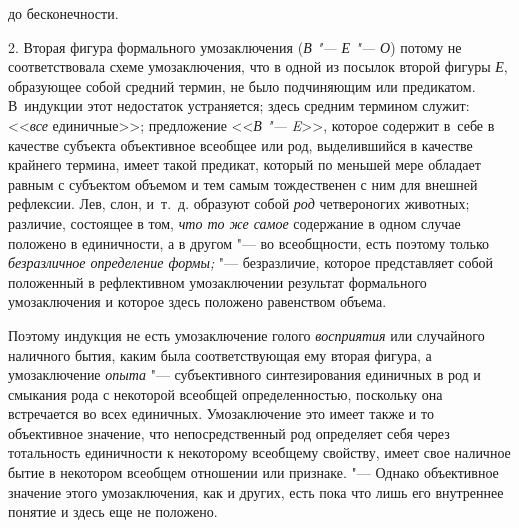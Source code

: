 {\centering
до бесконечности.
\par}

2. Вторая фигура формального умозаключения
({\em В "--- Е "--- О}) потому не соответствовала схеме
умозаключения, что в одной из посылок второй фигуры
{\em Е}, образующее собой
средний термин, не было подчиняющим или предикатом. В~индукции этот
недостаток устраняется; здесь средним термином служит:
<<{\em все} единичные>>;
предложение <<{\em В "--- E}>>,
которое содержит в~себе в качестве субъекта объективное
всеобщее или род, выделившийся в качестве крайнего термина, имеет такой
предикат, который по меньшей мере обладает равным с субъектом объемом и тем
самым тождественен с ним для внешней рефлексии. Лев, слон, и~т.~д. образуют
собой {\em род} четвероногих животных; различие, состоящее в том,
{\em что то же самое} содержание в одном случае положено в единичности,
а в другом "--- во всеобщности, есть поэтому только
{\em безразличное определение формы;}
"--- безразличие, которое представляет собой положенный в
рефлективном умозаключении результат формального умозаключения и которое
здесь положено равенством объема.

Поэтому индукция не есть умозаключение голого
{\em восприятия} или
случайного наличного бытия, каким была соответствующая ему вторая фигура, а
умозаключение {\em опыта}
"--- субъективного синтезирования единичных в род и смыкания
рода с некоторой всеобщей определенностью, поскольку она встречается во
всех единичных. Умозаключение это имеет также и то объективное значение,
что непосредственный род определяет себя через тотальность единичности к
некоторому всеобщему свойству, имеет свое наличное бытие в некотором
всеобщем отношении или признаке. "--- Однако объективное
значение этого умозаключения, как и других, есть пока что лишь его
внутреннее понятие и здесь еще не положено.

